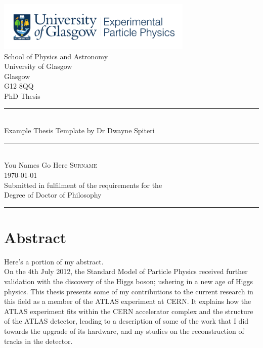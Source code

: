 \documentclass[12pt,titlepage,oneside]{book}
\newcommand{\tcg}[1]{\textcolor{GRASSGREEN}{#1}} %
\newcommand{\SM}{Standard Model }
\begin{document}


\thispagestyle{empty}%

	\begin{center} %
	\includegraphics[width=0.7\textwidth]{ExperPartPhys_colour.pdf}~\\[4mm]%
	School of Physics and Astronomy\\
	University of Glasgow\\
	Glasgow\\
	G12 8QQ\\[8mm] %

    {\Large PhD Thesis}
	\rule[0.4cm]{15cm}{.2pt}\\ %

	{\Huge Example Thesis Template by Dr Dwayne Spiteri}\\[1cm] %
	\rule[0.4cm]{15cm}{.2pt}\\[4cm] %
	{\LARGE You Names Go Here \textsc{Surname}}\\[1cm] %
	{\small \today}\\[1cm] %
	{\small 
		Submitted in fulfilment of the requirements for the\\
		Degree of Doctor of Philosophy}\\[1cm] %
	\rule[0.4cm]{15cm}{.2pt} 
	\end{center}

\pagestyle{plain} %
\frontmatter  %

\chapter{Abstract}
\tcg{Here's a portion of my abstract.}\\

On the 4th July 2012, the \SM of Particle Physics received further validation with the discovery of the Higgs boson; ushering in a new age of Higgs physics. This thesis presents some of my contributions to the current research in this field as a member of the ATLAS experiment at CERN. It explains how the ATLAS experiment fits within the CERN accelerator complex and the structure of the ATLAS detector, leading to a description of some of the work that I did towards the upgrade of its hardware, and my studies on the reconstruction of tracks in the detector.
\end{document}
